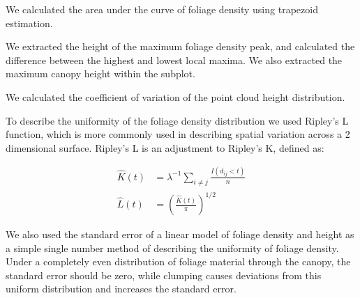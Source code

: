 \documentclass[11pt,a4paper]{article}
\begin{document}
We calculated the area under the curve of foliage density using trapezoid estimation.

We extracted the height of the maximum foliage density peak, and calculated the difference between the highest and lowest local maxima. We also extracted the maximum canopy height within the subplot.

We calculated the coefficient of variation of the point cloud height distribution.

To describe the uniformity of the foliage density distribution we used Ripley's L function, which is more commonly used in describing spatial variation across a 2 dimensional surface. Ripley's L is an adjustment to Ripley's K, defined as:

\begin{align}
	\widehat{K}(t) &= \lambda^{-1} \sum_{i\neq{}j} \frac{I(d_{ij} < t)}{n} \\
	\widehat{L}(t) &= \left(\frac{\widehat{K}(t)}{\pi}\right)^{1/2}
\end{align}

We also used the standard error of a linear model of foliage density and height as a simple single number method of describing the uniformity of foliage density. Under a completely even distribution of foliage material through the canopy, the standard error should be zero, while clumping causes deviations from this uniform distribution and increases the standard error.
\end{document}
